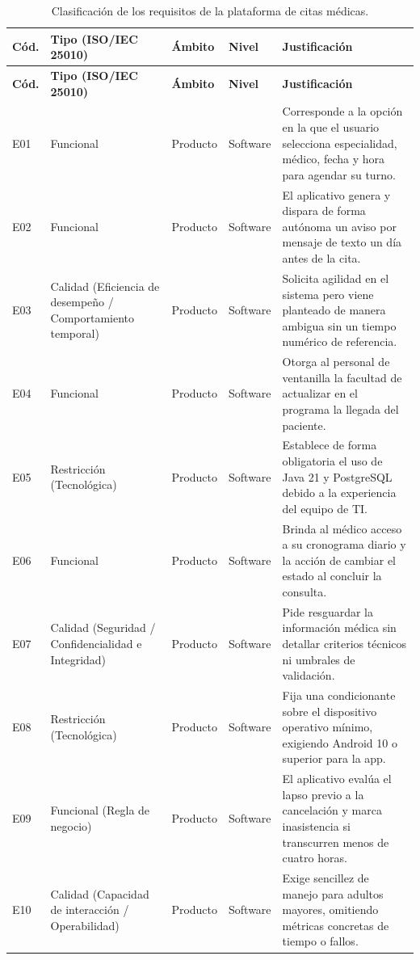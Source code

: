 \documentclass[10pt,a4paper]{article}
\begin{document}
\footnotesize
\begin{longtable}{@{}p{0.8cm}p{3.4cm}p{1.6cm}p{1.5cm}p{8.0cm}@{}}
\caption{Clasificaci\'on de los requisitos de la plataforma de citas m\'edicas.} \label{tab:clasificacion} \\
\toprule
\textbf{C\'od.} & \textbf{Tipo (ISO/IEC 25010)} & \textbf{\'Ambito} & \textbf{Nivel} & \textbf{Justificaci\'on} \\
\midrule
\endfirsthead
\toprule
\textbf{C\'od.} & \textbf{Tipo (ISO/IEC 25010)} & \textbf{\'Ambito} & \textbf{Nivel} & \textbf{Justificaci\'on} \\
\midrule
\endhead
\bottomrule
\endfoot
E01 & Funcional & Producto & Software & Corresponde a la opci\'on en la que el usuario selecciona especialidad, m\'edico, fecha y hora para agendar su turno. \\
E02 & Funcional & Producto & Software & El aplicativo genera y dispara de forma aut\'onoma un aviso por mensaje de texto un d\'ia antes de la cita. \\
E03 & Calidad (Eficiencia de desempe\~no / Comportamiento temporal) & Producto & Software & Solicita agilidad en el sistema pero viene planteado de manera ambigua sin un tiempo num\'erico de referencia. \\
E04 & Funcional & Producto & Software & Otorga al personal de ventanilla la facultad de actualizar en el programa la llegada del paciente. \\
E05 & Restricci\'on (Tecnol\'ogica) & Producto & Software & Establece de forma obligatoria el uso de Java 21 y PostgreSQL debido a la experiencia del equipo de TI. \\
E06 & Funcional & Producto & Software & Brinda al m\'edico acceso a su cronograma diario y la acci\'on de cambiar el estado al concluir la consulta. \\
E07 & Calidad (Seguridad / Confidencialidad e Integridad) & Producto & Software & Pide resguardar la informaci\'on m\'edica sin detallar criterios t\'ecnicos ni umbrales de validaci\'on. \\
E08 & Restricci\'on (Tecnol\'ogica) & Producto & Software & Fija una condicionante sobre el dispositivo operativo m\'inimo, exigiendo Android 10 o superior para la app. \\
E09 & Funcional (Regla de negocio) & Producto & Software & El aplicativo eval\'ua el lapso previo a la cancelaci\'on y marca inasistencia si transcurren menos de cuatro horas. \\
E10 & Calidad (Capacidad de interacci\'on / Operabilidad) & Producto & Software & Exige sencillez de manejo para adultos mayores, omitiendo m\'etricas concretas de tiempo o fallos. \\

\end{longtable}
\end{document}
